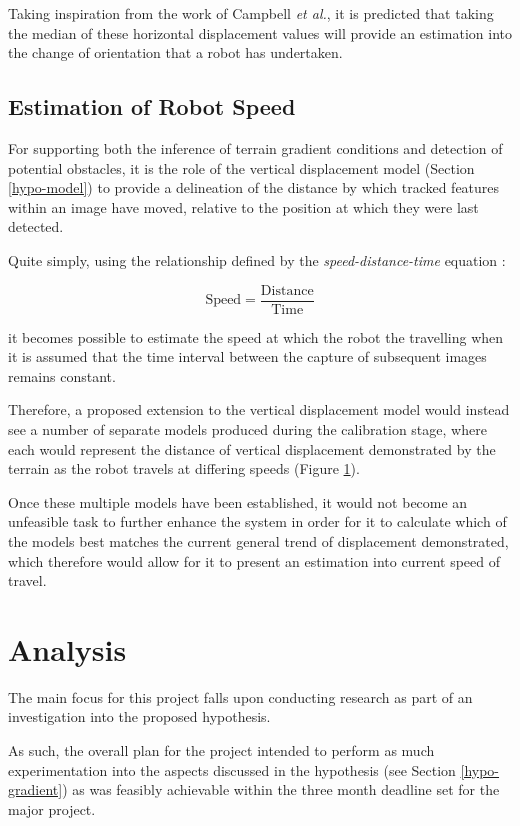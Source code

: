 Taking inspiration from the work of Campbell \textit{et al.}, it is predicted that taking the median of these horizontal displacement values will provide an estimation into the change of orientation that a robot has undertaken.

\subsection{Estimation of Robot Speed}
\label{hypo-speed}
For supporting both the inference of terrain gradient conditions and detection of potential obstacles, it is the role of the vertical displacement model (Section \ref{hypo-model})  to provide a delineation of the distance by which tracked features within an image have moved, relative to the position at which they were last detected. 

Quite simply, using the relationship defined by the \textit{speed-distance-time} equation \cite{}:

$$\text{Speed} = \frac{\text{Distance}}{\text{Time}}$$ 

it becomes possible to estimate the speed at which the robot the travelling when it is assumed that the time interval between the capture of subsequent images remains constant.

Therefore, a proposed extension to the vertical displacement model would instead see a number of separate models produced during the calibration stage, where each would represent the distance of vertical displacement demonstrated by the terrain as the robot travels at differing speeds (Figure \ref{}).

Once these multiple models have been established, it would not become an unfeasible task to further enhance the system in order for it to calculate which of the models best matches the current general trend of displacement demonstrated, which therefore would allow for it to present an estimation into current speed of travel.

\section{Analysis}

The main focus for this project falls upon conducting research as part of an investigation into the proposed hypothesis. 

As such, the overall plan for the project intended to perform as much experimentation into the aspects discussed in the hypothesis (see Section \ref{hypo-gradient}) as was feasibly achievable within the three month deadline set for the major project.

